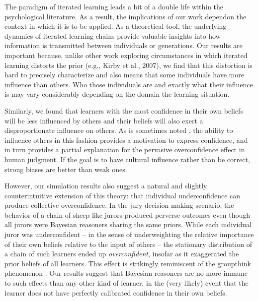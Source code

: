 \documentclass[doc]{apa6}
\begin{document}
The paradigm of iterated learning leads a bit of a  double life within the psychological literature. As a result, the implications of our work dependon the context in which it is to be applied. As a theoretical tool, the underlying dynamics of iterated learning chains provide valuable insights into how information is transmitted between individuals or generations. %
Our results are important because, unlike other work exploring circumstances in which iterated learning distorts the prior (e.g., Kirby et al., 2007), we find that this distortion is hard to precisely characterize and also means that some individuals have more influence than others. Who those individuals are and exactly what their influence is may vary considerably depending on the domain the learning situation.


Similarly, we found that learners with the most confidence in their own beliefs will be less influenced by others and their beliefs will also exert a disproportionate influence on others. As is sometimes noted \parencite[e.g.,][]{russo_managing_1992}, the ability to influence others in this fashion provides a motivation to express confidence, and in turn provides a partial explanation for the pervasive overconfidence effect \parencite[e.g.,][]{lichtenstein_calibration_1977} in human judgment. If the goal is to have cultural influence rather than be correct, strong biases are better than weak ones.

However, our simulation results also suggest a natural and slightly counterintuitive extension of this theory: that individual underconfidence can produce collective overconfidence. In the jury decision-making scenario, the behavior of a chain of {\sc sheep}-like jurors produced perverse outcomes even though all jurors were Bayesian reasoners sharing the same priors. While each individual juror was underconfident -- in the sense of underweighting the relative importance of their own beliefs relative to the input of others -- the stationary distribution of a chain of such learners ended up {\it overconfident}, insofar as it exaggerated the prior beliefs of all learners. This effect is strikingly reminiscent of the groupthink phenomenon \parencite{janis1982groupthink,esser_alive_1998}. Our results suggest that Bayesian reasoners are no more immune to such effects than any other kind of learner, in the (very likely) event that the learner does not have perfectly calibrated confidence in their own beliefs. 
\end{document}
